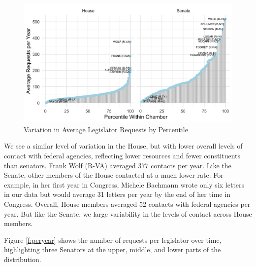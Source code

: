 \documentclass[12pt]{article}
\begin{document}
{\begin{figure}
\centering
\caption{Variation in Average Legislator Requests by Percentile} \label{f:contact1} 
\begin{minipage}{\textwidth}
\includegraphics[width = \textwidth]{figs/percentiles-1}
\end{minipage}
\end{figure}


We see a similar level of variation in the House, but with lower overall levels of contact with federal agencies, reflecting lower resources and fewer constituents than senators. Frank Wolf (R-VA) averaged 377 contacts per year. Like the Senate, other members of the House contacted at a much lower rate. For example, in her first year in Congress,  Michele Bachmann wrote only six letters in our data but would average 31 letters per year by the end of her time in Congress. Overall, House members averaged 52 contacts with federal agencies per year. But like the Senate, we large variability in the levels of contact across House members.  

Figure \ref{f:peryear} shows the number of requests per legislator over time, highlighting three Senators at the upper, middle, and lower parts of the distribution.

}
\end{document}
